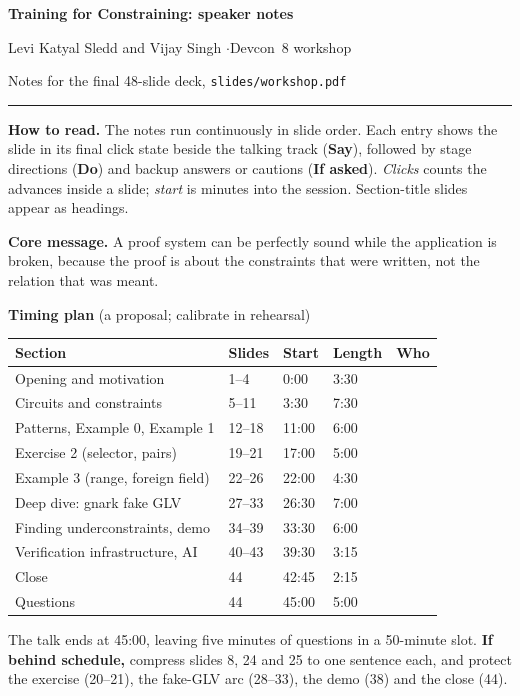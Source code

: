 \documentclass[11pt]{article}
\begin{document}
{\LARGE\bfseries Training for Constraining: speaker notes\par}
\vspace{2pt}
{\normalsize Levi Katyal Sledd and Vijay Singh \quad$\cdot$\quad Devcon~8 workshop\par}
{\small Notes for the final 48-slide deck, \texttt{slides/workshop.pdf}\par}
{\color{accent}\rule{\linewidth}{0.7pt}}

\textbf{How to read.} The notes run continuously in slide order. Each entry shows the slide in its
final click state beside the talking track (\textbf{Say}), followed by stage directions (\textbf{Do})
and backup answers or cautions (\textbf{If asked}). \emph{Clicks} counts the advances inside a slide;
\emph{start} is minutes into the session. Section-title slides appear as headings.

\textbf{Core message.} A proof system can be perfectly sound while the application is broken, because
the proof is about the constraints that were written, not the relation that was meant.

\textbf{Timing plan} (a proposal; calibrate in rehearsal)\par\vspace{2pt}
{\small
\begin{tabular}{@{}lllll@{}}\toprule
Section & Slides & Start & Length & Who\\\midrule
Opening and motivation & 1--4 & 0:00 & 3:30 & \\
Circuits and constraints & 5--11 & 3:30 & 7:30 & \\
Patterns, Example 0, Example 1 & 12--18 & 11:00 & 6:00 & \\
Exercise 2 (selector, pairs) & 19--21 & 17:00 & 5:00 & \\
Example 3 (range, foreign field) & 22--26 & 22:00 & 4:30 & \\
Deep dive: gnark fake GLV & 27--33 & 26:30 & 7:00 & \\
Finding underconstraints, demo & 34--39 & 33:30 & 6:00 & \\
Verification infrastructure, AI & 40--43 & 39:30 & 3:15 & \\
Close & 44 & 42:45 & 2:15 & \\
Questions & 44 & 45:00 & 5:00 & \\\bottomrule
\end{tabular}\par}
The talk ends at 45:00, leaving five minutes of questions in a 50-minute slot.
\textbf{If behind schedule,} compress slides 8, 24 and 25 to one sentence each, and protect the exercise
(20--21), the fake-GLV arc (28--33), the demo (38) and the close (44).
\end{document}
